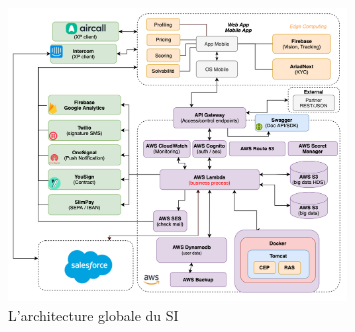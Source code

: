 \begin{figure}[H]
\centering
\includegraphics[width=0.8\textwidth]{Figures/architecture}
\decoRule
\caption[L'architecture globale du SI]{L'architecture globale du SI}
\label{fig:Architecture}
\end{figure}





